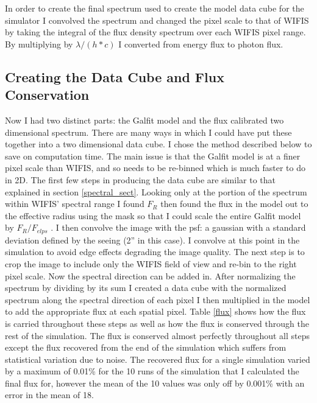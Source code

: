 \documentclass[11pt,twoside]{article}
\begin{document}
In order to create the final spectrum used to create the model data cube for the simulator I convolved the spectrum and changed the pixel scale to that of WIFIS by taking the integral of the flux density spectrum over each WIFIS pixel range.  By multiplying by $\lambda/(h*c)$ I converted from energy flux to photon flux.

\subsection{Creating the Data Cube and Flux Conservation}\label{flux_sec}
Now I had two distinct parts: the Galfit model and the flux calibrated two dimensional spectrum. There are many ways in which I could have put these together into a two dimensional data cube. I chose the method described below to save on computation time. The main issue is that the Galfit model is at a finer pixel scale than WIFIS, and so needs to be re-binned which is much faster to do in 2D. The first few steps in producing the data cube are similar to that explained in section \ref{spectral_sect}. Looking only at the portion of the spectrum within WIFIS' spectral range I found $F_R$ then found the flux in the model out to the effective radius using the mask  so that I could scale the entire Galfit model by $F_R/F_{elps}$ .  I then convolve the image with the psf: a gaussian with a standard deviation defined by the seeing (2'' in this case). I convolve at this point in the simulation to avoid edge effects degrading the image quality. The next step is to crop the image to include only the WIFIS field of view and re-bin to the right pixel scale. Now the spectral direction can be added in. After normalizing the spectrum by dividing by its sum I created a data cube with the normalized spectrum along the spectral direction of each pixel I then multiplied in the model to add the appropriate flux at each spatial pixel. Table \ref{flux} shows how the flux is carried throughout these steps as well as how the flux is conserved through the rest of the simulation. The flux is conserved almost perfectly throughout all steps except the flux recovered from the end of the simulation which suffers from statistical variation due to noise. The recovered flux for a single simulation varied by a maximum of 0.01\% for the 10 runs of the simulation that I calculated the final flux for, however the mean of the 10 values was only off by 0.001\% with an error in the mean of 18.
\end{document}
